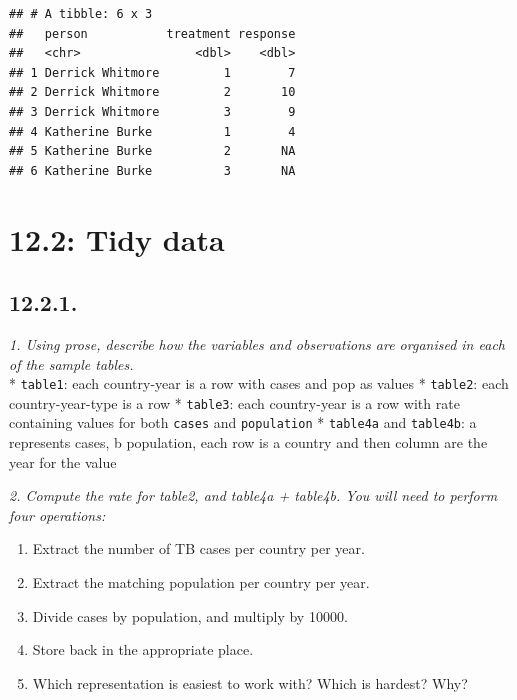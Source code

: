 \documentclass[]{book}
\newenvironment{Shaded}{\begin{snugshade}}{\end{snugshade}}
\newcommand{\KeywordTok}[1]{\textcolor[rgb]{0.13,0.29,0.53}{\textbf{#1}}}
\newcommand{\NormalTok}[1]{#1}
\newcommand{\OperatorTok}[1]{\textcolor[rgb]{0.81,0.36,0.00}{\textbf{#1}}}
\newcommand{\StringTok}[1]{\textcolor[rgb]{0.31,0.60,0.02}{#1}}
\providecommand{\tightlist}{%
  \setlength{\itemsep}{0pt}\setlength{\parskip}{0pt}}
\theoremstyle{definition}
\theoremstyle{definition}
\theoremstyle{definition}
\theoremstyle{remark}
\begin{document}
\begin{Shaded}
\end{Shaded}

\begin{verbatim}
## # A tibble: 6 x 3
##   person           treatment response
##   <chr>                <dbl>    <dbl>
## 1 Derrick Whitmore         1        7
## 2 Derrick Whitmore         2       10
## 3 Derrick Whitmore         3        9
## 4 Katherine Burke          1        4
## 5 Katherine Burke          2       NA
## 6 Katherine Burke          3       NA
\end{verbatim}

\hypertarget{tidy-data}{%
\section{12.2: Tidy data}\label{tidy-data}}

\hypertarget{section-31}{%
\subsection{12.2.1.}\label{section-31}}

\emph{1. Using prose, describe how the variables and observations are
organised in each of the sample tables.}\\
* \texttt{table1}: each country-year is a row with cases and pop as
values * \texttt{table2}: each country-year-type is a row *
\texttt{table3}: each country-year is a row with rate containing values
for both \texttt{cases} and \texttt{population} * \texttt{table4a} and
\texttt{table4b}: a represents cases, b population, each row is a
country and then column are the year for the value

\emph{2. Compute the rate for table2, and table4a + table4b. You will
need to perform four operations:}

\begin{enumerate}
\def\labelenumi{\alph{enumi}.}
\tightlist
\item
  Extract the number of TB cases per country per year.\\
\item
  Extract the matching population per country per year.\\
\item
  Divide cases by population, and multiply by 10000.\\
\item
  Store back in the appropriate place.\\
\item
  Which representation is easiest to work with? Which is hardest? Why?
\end{enumerate}
\end{document}
